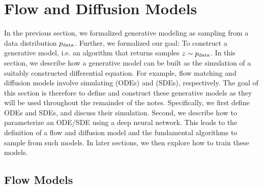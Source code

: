 \section{Flow and Diffusion Models}
\label{sec:odes_sdes}
In the previous section, we formalized generative modeling as sampling from a data distribution $p_{\rm{data}}$. Further, we formalized our goal: To construct a generative model, i.e. an algorithm that returns samples $z\sim p_{\rm{data}}$. In this section, we describe how a generative model can be built as the simulation of a suitably constructed differential equation. For example, flow matching and diffusion models involve simulating  (ODEs) and  (SDEs), respectively. The goal of this section is therefore to define and construct these generative models as they will be used throughout the remainder of the notes. Specifically, we first define ODEs and SDEs, and discuss their simulation. Second, we describe how to parameterize an ODE/SDE using a deep neural network. This leads to the definition of a flow and diffusion model and the fundamental algorithms to sample from such models. In later sections, we then explore how to train these models.


\subsection{Flow Models}

